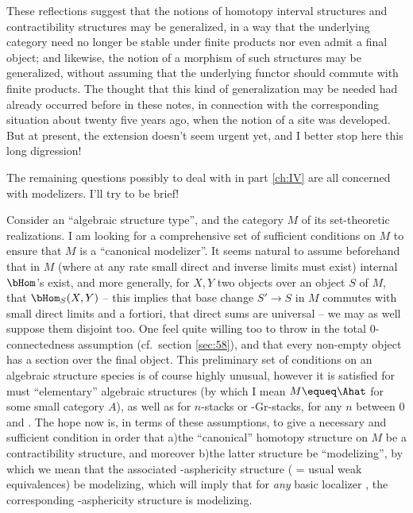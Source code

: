 These reflections suggest that the notions of homotopy interval
structures and contractibility structures may be generalized, in a way
that the underlying category need no longer be stable under finite
products nor even admit a final object; and likewise, the notion of a
morphism of such structures may be generalized, without assuming that
the underlying functor should commute with finite products. The
thought that this kind of generalization may be needed had already
occurred before in these notes, in connection with the corresponding
situation about twenty five years ago, when the notion of a site was
developed. But at present, the extension doesn't seem urgent yet, and
I better stop here this long digression!

The remaining questions possibly to deal with in part \ref{ch:IV} are
all concerned with modelizers. I'll try to be brief!

\enspace Consider an ``algebraic structure
type'', and the category $M$ of its set-theoretic realizations. I am
looking for a comprehensive set of sufficient conditions on $M$ to
ensure that $M$ is a ``canonical modelizer''. It seems natural to
assume beforehand that in $M$ (where at any rate small direct and
inverse limits must exist) internal $\bHom$'s exist, and more
generally, for $X,Y$ two objects over an object $S$ of $M$, that
$\bHom_S(X,Y)$ -- this implies that base change $S'\to S$ in $M$
commutes with small direct limits and a fortiori, that direct sums are
universal -- we may as well suppose them disjoint too. One feel quite
willing too to throw in the total $0$-connectedness assumption (cf.\
section \ref{sec:58}), and that every non-empty object has a section
over the final object. This preliminary set of conditions on an
algebraic structure species is of course highly unusual, however it is
satisfied for must ``elementary'' algebraic structures (by which I
mean $M\equeq \Ahat$ for some small category $A$), as well as for
$n$-stacks or \oo-Gr-stacks, for any $n$ between $0$ and \oo. The hope
now is, in terms of these assumptions, to give a necessary and
sufficient condition in order that a)\enspace the ``canonical''
homotopy structure on $M$ be a contractibility structure, and moreover
b)\enspace the latter structure be ``modelizing'', by which we mean
that the\pspage{300} associated \scrWoo-asphericity structure (\scrWoo{}
= usual weak equivalences) be modelizing, which will imply that for
\emph{any} basic localizer \scrW, the corresponding \scrW-asphericity
structure is modelizing.

